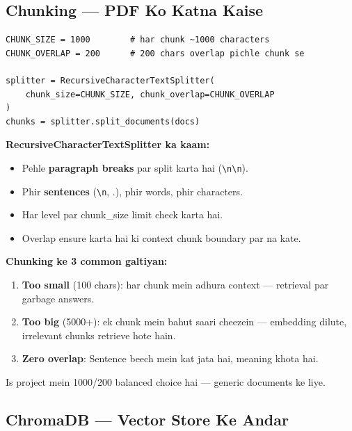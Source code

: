 \subsection{Chunking --- PDF Ko Katna Kaise}

\begin{codestorybox}
\begin{lstlisting}[style=pythonstyle, caption={Chunking settings}]
CHUNK_SIZE = 1000        # har chunk ~1000 characters
CHUNK_OVERLAP = 200      # 200 chars overlap pichle chunk se

splitter = RecursiveCharacterTextSplitter(
    chunk_size=CHUNK_SIZE, chunk_overlap=CHUNK_OVERLAP
)
chunks = splitter.split_documents(docs)
\end{lstlisting}

\textbf{RecursiveCharacterTextSplitter ka kaam:}
\begin{itemize}
\item Pehle \textbf{paragraph breaks} par split karta hai (\texttt{\textbackslash n\textbackslash n}).
\item Phir \textbf{sentences} (\texttt{\textbackslash n}, .), phir words, phir characters.
\item Har level par chunk\_size limit check karta hai.
\item Overlap ensure karta hai ki context chunk boundary par na kate.
\end{itemize}
\end{codestorybox}

\begin{warningbox}
\textbf{Chunking ke 3 common galtiyan:}
\begin{enumerate}[label=\arabic*.]
\item \textbf{Too small} (100 chars): har chunk mein adhura context --- retrieval par garbage answers.
\item \textbf{Too big} (5000+): ek chunk mein bahut saari cheezein --- embedding dilute, irrelevant chunks retrieve hote hain.
\item \textbf{Zero overlap}: Sentence beech mein kat jata hai, meaning khota hai.
\end{enumerate}
Is project mein 1000/200 balanced choice hai --- generic documents ke liye.
\end{warningbox}

\subsection{ChromaDB --- Vector Store Ke Andar}

